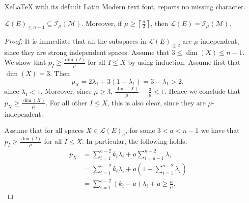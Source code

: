 \documentclass[10pt,a4paper]{amsart}
\newcommand{\mI}{\mathcal{I}}
\newcommand{\mL}{\mathcal{L}}
\newcommand{\mM}{\mathcal{M}}
\begin{document}
XeLaTeX with its default Latin Modern text font, reports no missing character.
\begin{theorem}\label{thm:mu_indep_flag_uniform}
$\mL(E)_{\leq n-1} \subseteq \mI_{\mu}(\mM)$.  Moreover, if $\mu\geq \left\lceil \frac{n}{2}\right\rceil$, then $\mL(E)=\mI_\mu(\mM)$.
\end{theorem}

\begin{proof}
  It is immediate that all the subspaces in $\mL(E)_{\leq 2}$ are $\mu$-independent, since they are strong independent spaces. Assume that $3\leq \dim(X)\leq n-1$. We show that $p_I\geq \frac{\dim(I)}{\mu}$ for all $I\leq X$ by using induction. Assume first that $\dim(X)=3$. Then
 $$p_X = 2\lambda_1 +3(1-\lambda_1)=3-\lambda_1>2,$$
 since $\lambda_1<1$. Moreover, since $\mu\geq 3$,  $\frac{\dim(X)}{\mu} = \frac{3}{\mu} \leq 1$. Hence we conclude that $p_X\geq \frac{\dim(X)}{\mu}$. For all other $I\leq X$, this is also clear, since they are $\mu$-independent. 

Assume that for all spaces $X\in\mL(E)_a$, for some $3<a<n-1$ we have that $p_I\geq \frac{\dim(I)}{\mu}$ for all $I\leq X$. 
In particular, the following holds:
\begin{align*}
    p_X &= \sum\limits_{i=1}^{a-2}k_i\lambda_i + a\sum\limits_{i=a-1}^{n-2}\lambda_i \\
    &= \sum\limits_{i=1}^{a-2}k_i\lambda_i + a\left(1-\sum\limits_{i=1}^{a-2}\lambda_i \right) \\
    &=\sum\limits_{i=1}^{a-2}(k_i-a)\lambda_i + a \geq \frac{a}{\mu}.
\end{align*}


\end{proof}
\end{document}
